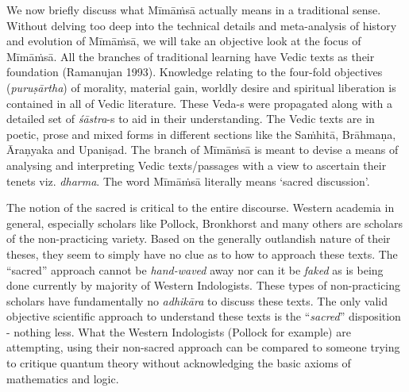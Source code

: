 \vskip 3pt

We now briefly discuss what Mīmāṁsā actually means in a traditional sense. Without delving too deep into the technical details and meta-analysis of history and evolution of Mīmāṁsā, we will take an objective look at the focus of Mīmāṁsā. All the branches of traditional learning have Vedic texts as their foundation (Ramanujan 1993). Knowledge relating to the four-fold objectives (\textit{puruṣārtha}) of morality, material gain, worldly desire and spiritual liberation is contained in all of Vedic literature. These Veda-s were propagated along with a detailed set of \textit{śāstra}-s to aid in their understanding. The Vedic texts are in poetic, prose and mixed forms in different sections like the Saṁhitā, Brāhmaṇa, Āraṇyaka and Upaniṣad. The branch of Mīmāṁsā is meant to devise a means of analysing and interpreting Vedic texts/passages with a view to ascertain their tenets viz. \textit{dharma}. The word Mīmāṁsā literally means ‘sacred discussion’.

\vskip 3pt

The notion of the sacred is critical to the entire discourse. Western academia in general, especially scholars like Pollock, Bronkhorst and many others are scholars of the non-practicing variety. Based on the generally outlandish nature of their theses, they seem to simply have no clue as to how to approach these texts. The ``sacred” approach cannot be \textit{hand-waved} away nor can it be \textit{faked} as is being done currently by majority of Western Indologists. These types of non-practicing scholars have fundamentally no \textit{adhikāra} to discuss these texts. The only valid objective scientific approach to understand these texts is the ``\textit{sacred}” disposition - nothing less. What the Western Indologists (Pollock for example) are attempting, using their non-sacred approach can be compared to someone trying to critique quantum theory without acknowledging the basic axioms of mathematics and logic.

\vskip 3pt

